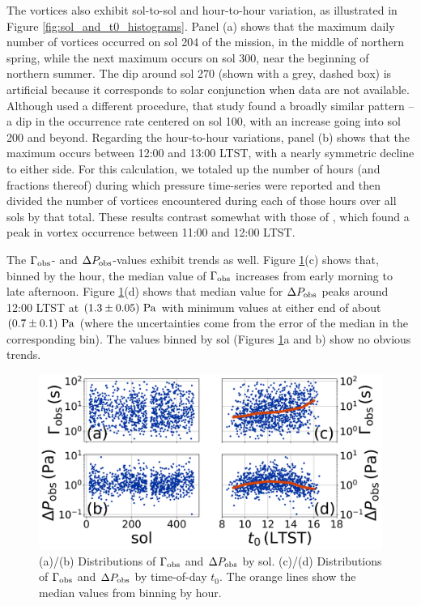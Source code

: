 \documentclass[linenumbers,trackchanges]{aastex63}
\begin{document}
The vortices also exhibit sol-to-sol and hour-to-hour variation, as illustrated in Figure \ref{fig:sol_and_t0_histograms}. Panel (a) shows that the maximum daily number of vortices occurred on sol 204 of the mission, in the middle of northern spring, while the next maximum occurs on sol 300, near the beginning of northern summer. The dip around sol 270 (shown with a grey, dashed box) is artificial because it corresponds to solar conjunction when data are not available. Although \citet{2021JGRE..12606511S} used a different procedure, that study found a broadly similar pattern -- a dip in the occurrence rate centered on sol 100, with an increase going into sol 200 and beyond. Regarding the hour-to-hour variations, panel (b) shows that the maximum occurs between 12:00 and 13:00 LTST, with a nearly symmetric decline to either side. For this calculation, we totaled up the number of hours (and fractions thereof) during which pressure time-series were reported and then divided the number of vortices encountered during each of those hours over all sols by that total. These results contrast somewhat with those of \citet{2021JGRE..12606511S}, which found a peak in vortex occurrence between 11:00 and 12:00 LTST. 

The $\Gamma_{\rm obs}$- and $\Delta P_{\rm obs}$-values  exhibit  trends as well. Figure \ref{fig:Gammaobs_DeltaPobs_vs_TOD_and_sol}(c) shows that, binned by the hour, the median value of $\Gamma_{\rm obs}$  increases  from early morning to late afternoon. Figure \ref{fig:Gammaobs_DeltaPobs_vs_TOD_and_sol}(d) shows that median value for $\Delta P_{\rm obs}$ peaks around 12:00 LTST at $\left( 1.3\pm0.05 \right)\,{\rm Pa}$ with minimum values at either end of about $\left( 0.7\pm 0.1 \right)\,{\rm Pa}$ (where the uncertainties come from the error of the median in the corresponding bin).  The values binned by sol (Figures \ref{fig:Gammaobs_DeltaPobs_vs_TOD_and_sol}a and b) show no obvious trends. 

\begin{figure}
    \centering
    \includegraphics[width=\textwidth]{figures/Gammaobs_DeltaPobs_vs_TOD_and_sol.png}
    \caption{(a)/(b) Distributions of $\Gamma_{\rm obs}$ and $\Delta P_{\rm obs}$ by sol. (c)/(d) Distributions of $\Gamma_{\rm obs}$ and $\Delta P_{\rm obs}$ by time-of-day $t_0$. The orange lines show the median values from binning by hour.}
    \label{fig:Gammaobs_DeltaPobs_vs_TOD_and_sol}
\end{figure}
\end{document}
